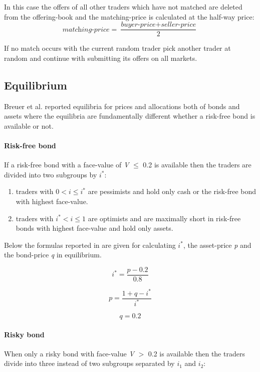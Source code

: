 \documentclass[../Bachelorarbeit.tex]{subfiles}
\begin{document}
In this case the offers of all other traders which have not matched are deleted from the offering-book and the matching-price is calculated at the half-way price:
\begin{equation}
\textit{matching-price} = \frac{\textit{buyer-price} + \textit{seller-price}}{2}
\end{equation}

If no match occurs with the current random trader pick another trader at random and continue with submitting its offers on all markets.

\subsection{Equilibrium}
\label{sec:EQUILIBRIUM}
Breuer et al. reported equilibria for prices and allocations both of bonds and assets where the equilibria are fundamentally different whether a risk-free bond is available or not.

\paragraph{Risk-free bond}
If a risk-free bond with a face-value of \textit{V} $\leq$ 0.2 is available then the traders are divided into two subgroups by $i^*$:

\begin{enumerate}
\item traders with $0 < i \leq i^*$ are pessimists and hold only cash or the risk-free bond with highest face-value.
\item traders with $i^* < i \leq 1$ are optimists and are maximally short in risk-free bonds with highest face-value and hold only assets.
\end{enumerate}

Below the formulas reported in \cite{Breuer2015} are given for calculating $i^*$, the asset-price \textit{p} and the bond-price \textit{q} in equilibrium.

\begin{equation}
i^* = \frac{p - 0.2}{0.8}
\end{equation}

\begin{equation}
p = \frac{1 + q - i^*}{i^*}
\end{equation}

\begin{equation}
q = 0.2
\end{equation}

\paragraph{Risky bond}
When only a risky bond with face-value \textit{V} $>$ 0.2 is available then the traders divide into three instead of two subgroups separated by $i_{1}$ and $i_{2}$:
\end{document}
